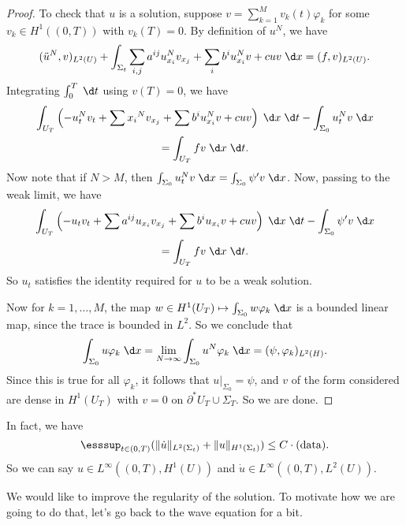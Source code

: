 \documentclass[a4paper]{article}
\begin{document}
\begin{proof}
  To check that $u$ is a solution, suppose $v = \sum_{k = 1}^M v_k(t) \varphi_k$ for some $v_k \in H^1((0, T))$ with $v_k(T) = 0$. By definition of $u^N$, we have
  \[
    (\ddot{u}^N, v)_{L^2(U)} + \int_{\Sigma_t} \sum_{i, j} a^{ij} u_{x_i}^N v_{x_j} + \sum_i b^i u_{x_i}^N v + cuv \;\d x = (f, v)_{L^2(U)}.
  \]
  Integrating $\int_0^T \;\d t$ using $v(T) = 0$, we have
  \begin{multline*}
    \int_{U_T} \left(-u_t^N v_t + \sum{x_i}^N v_{x_j} + \sum b^i u_{x_i}^N v + cuv\right) \;\d x \;\d t - \int_{\Sigma_0} u_t^N v\;\d x \\
    = \int_{U_T} fv\;\d x\;\d t.
  \end{multline*}
  Now note that if $N > M$, then $\int_{\Sigma_0} u_t^N v\;\d x = \int_{\Sigma_0} \psi' v \;\d x$. Now, passing to the weak limit, we have
  \begin{multline*}
    \int_{U_T} \left(-u_t v_t + \sum a^{ij} u_{x_i} v_{x_j} + \sum b^i u_{x_i} v + cuv\right) \;\d x \;\d t - \int_{\Sigma_0}\psi' v\;\d x \\
    = \int_{U_T} fv\;\d x\;\d t.
  \end{multline*}
  So $u_t$ satisfies the identity required for $u$ to be a weak solution.

  Now for $k = 1, \ldots, M$, the map $w \in H^1(U_T) \mapsto \int_{\Sigma_0} w \varphi_k \;\d x$ is a bounded linear map, since the trace is bounded in $L^2$. So we conclude that
  \[
    \int_{\Sigma_0} u \varphi_k \;\d x = \lim_{N \to \infty} \int_{\Sigma_0} u^N \varphi_k \;\d x = (\psi, \varphi_k)_{L^2(H)}.
  \]
  Since this is true for all $\varphi_k$, it follows that $u|_{\Sigma_0} = \psi$, and $v$ of the form considered are dense in $H^1(U_T)$ with $v = 0$ on $\partial^*U_T \cup \Sigma_T$. So we are done.
\end{proof}

In fact, we have
\[
  \esssup_{t \in (0, T)} (\|\dot{u}\|_{L^2(\Sigma_t)} + \|u\|_{H^1(\Sigma_t)}) \leq C \cdot (\mathrm{data}).
\]
So we can say $u \in L^\infty( (0, T), H^1(U))$ and $\dot{u} \in L^\infty((0, T), L^2(U))$.


We would like to improve the regularity of the solution. To motivate how we are going to do that, let's go back to the wave equation for a bit.
\end{document}
